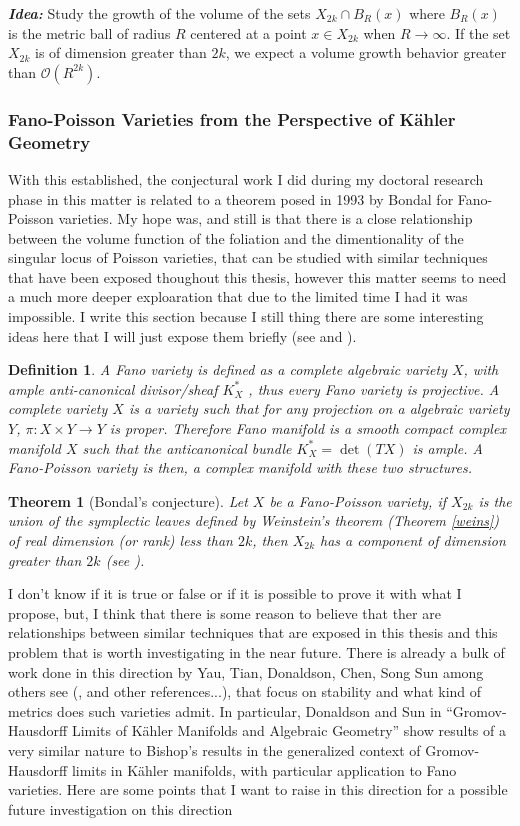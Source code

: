 \documentclass[12pt,twoside,a4paper]{report}
\newtheorem{definition}{Definition}[section]
\newtheorem{theorem}{Theorem}[section]
\newcommand{\osheaf}{\ensuremath{\mathcal O }}
\begin{document}
\noindent\emph{\bf Idea:} Study the growth of the volume of the sets $X_{2k}\cap B_{R}(x)$ where $B_R(x)$ is the metric ball of radius $R$ centered at a point $x\in X_{2k}$ when $R\rightarrow\infty$. If the set $X_{2k}$ is of dimension greater than $2k$, we expect a volume growth behavior greater than $\osheaf(R^{2k}).$

\subsubsection*{Fano-Poisson Varieties from the Perspective of Kähler Geometry}
\noindent With this established, the conjectural work I did during my doctoral research phase in this matter is related to a theorem posed in 1993 by Bondal for Fano-Poisson varieties. My hope was, and still is that there is a close relationship between the volume function of the foliation and the dimentionality of the singular locus of Poisson varieties, that can be studied with similar techniques that have been exposed thoughout this thesis, however this matter seems to need a much more deeper exploaration that due to the limited time I had it was impossible. I write this section because I still thing there are some interesting ideas here that I will just expose them briefly (see \cite{S-Yau} and \cite{ZB}).
\begin{definition}
  A \emph{Fano variety} is defined as a complete algebraic variety $X$,  with ample anti-canonical divisor/sheaf $K^{*}_{X}$ , thus every Fano variety is \emph{projective}.
  A complete variety $X$ is a variety such that for any projection on a algebraic variety $Y$, \hbox{$\pi:X\times Y\to Y$} is proper.
  Therefore Fano manifold is a smooth compact complex manifold $X$ such that the anticanonical bundle $K^{*}_X=\det(TX)$ is ample.
  A \emph{Fano-Poisson} variety is then, a complex manifold with these two structures.
\end{definition}
\begin{theorem}[Bondal's conjecture]\label{Bondal}
  Let $X$ be a Fano-Poisson variety, if $X_{2k}$ is the union of the symplectic leaves defined by Weinstein's theorem (Theorem \ref{weins})
  of real dimension (or rank) less than $2k$, then $X_{2k}$ has a component of dimension greater than $2k$ (see \cite{Bondal}).
\end{theorem}
\noindent I don't know if it is true or false or if it is possible to prove it with what I propose, but, I think that there is some reason to believe that ther are relationships between similar techniques that are exposed in this thesis and this problem that is worth investigating in the near future.
There is already a bulk of work done in this direction by Yau, Tian, Donaldson, Chen, Song Sun  among others see (\cite{D-SS},\cite{S-Yau} and other references...), that focus on stability and what kind of metrics does such varieties admit. In particular, Donaldson and Sun in ``Gromov-Hausdorff Limits of Kähler Manifolds and Algebraic Geometry'' show results of a very similar nature to Bishop's results in the generalized context of Gromov-Hausdorff limits in Kähler manifolds, with particular application to Fano varieties. Here are some points that I want to raise in this direction for a possible future investigation on this direction 
\end{document}
